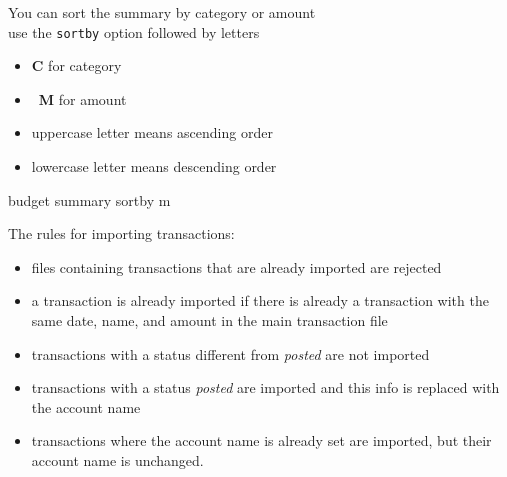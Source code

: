 \documentclass[12pt,letterpaper]{article}
\begin{document}
\begin{framed}
    \begin{minipage}[t][3in][t]{5in}
        \Large
        You can sort the summary by category or amount\\

        use the \lstinline[language=budget,basicstyle=\Large]!sortby! option followed by letters
        \begin{itemize}
            \item \textbf{C} for category
                \item \textbf{M} for amount
            \item uppercase letter means ascending order
            \item lowercase letter means descending order
        \end{itemize}
        \begin{budget}
            budget summary sortby m
                \end{budget}
    \end{minipage}
\end{framed}
\begin{framed}
    \begin{minipage}[t][3in][t]{5in}
        \Large
        The rules for importing transactions:\\
        \normalsize
        \begin{minipage}[t]{4in}
        \begin{itemize}
            \item files containing transactions that are already imported are rejected
            \item a transaction is already imported if there is already a transaction with the same date, name, and amount in the main transaction file 
            \item transactions with a status different from \emph{posted} are not imported 
            \item transactions with a status \emph{posted} are imported and this info is replaced with the account name
            \item transactions where the account name is already set are imported, but their account name is unchanged.
        \end{itemize}
    \end{minipage}

    \end{minipage}
\end{framed}
\end{document}
